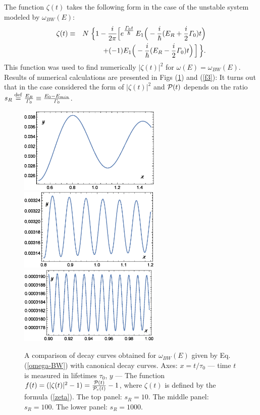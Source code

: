 \documentclass[12pt]{article}
\begin{document}
The function $\zeta(t)$ takes the following form in the case of the unstable system modeled by $\omega_{BW}(E)$:
\begin{eqnarray}
\zeta(t) &\equiv& N\; \Big\{1 - \frac{i}{2\pi} \Big[
e^{\textstyle{\frac{{\it\Gamma}_{0}t}{\hbar}}}\,
E_{1}\Big(-\frac{i}{\hbar}(E_{R}
+ \frac{i}{2} {\it\Gamma}_{0})t\Big) \nonumber\\
&&\;\;\;\;\;+ (-1) E_{1}\Big(- \frac{i}{\hbar}(E_{R} -
\frac{i}{2} {\it\Gamma}_{0})t\Big)\,\Big]\, \Big\}. \label{zeta1}
\end{eqnarray}
This function was used to find numerically $|\zeta (t)|^{2}$ for $\omega (E) = \omega_{BW}(E)$.
Results of numerical  calculations are presented
in Figs (\ref{f2}) and (\ref{f3}):
It turns out that in the case considered the form of  $|\zeta (t)|^{2}$ and ${\cal P}(t)$ depends on the ratio $s_{R} \stackrel{\rm def}{=} \frac{E_{R}}{{\it\Gamma}_{0}} \equiv \frac{E_{0} - E_{min}}{{\it\Gamma}_{0}}$.
\begin{figure}[h!]
\begin{center}
\includegraphics[width=68mm]{f3a.eps}\\
\includegraphics[width=68mm]{f3b.eps}\\
\includegraphics[width=68mm]{f3c.eps}\\
\caption{A comparison of decay curves obtained for $\omega_{BW}(E)$ given by Eq. (\ref{omega-BW}) with canonical decay curves.
Axes: $x =t / \tau_{0} $ --- time $t$ is measured in lifetimes
$\tau_{0}$,   $y$ --- The function $f(t) = (|\zeta (t)|^{2} -1) = \frac{{\cal P}(t)}{{\cal P}_{c}(t)} - 1$, where $\zeta (t)$ is defined by the formula (\ref{zeta}).  The top panel:  $s_{R} = 10$. The middle panel: $s_{R} = 100$. The lower panel: $s_{R} = 1000$. }
  \label{f2}
\end{center}
\end{figure}
\end{document}
